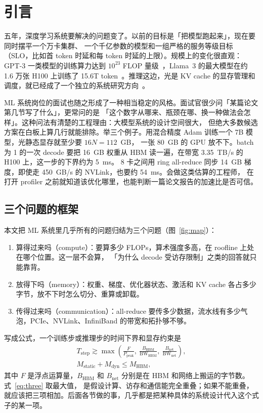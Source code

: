 \section{引言}
\label{sec:intro}

五年，深度学习系统要解决的问题变了。以前的目标是「把模型跑起来」，现在要同时摆平一个万卡集群、
一个千亿参数的模型和一组严格的服务等级目标（SLO，比如首 token 时延和每 token 时延的上限）。规模上的变化很直观：
GPT-3 一类模型的训练算力达到 $10^{23}$ FLOP 量级~\cite{brown2020gpt3}，Llama~3 的最大模型在约 1.6 万张 H100 上训练了
15.6T token~\cite{dubey2024llama3}。推理这边，光是 KV cache 的显存管理和调度，就已经成了一个独立的系统研究方向~\cite{kwon2023vllm,yu2022orca,agrawal2024sarathi,zhong2024distserve}。

ML 系统岗位的面试也随之形成了一种相当稳定的风格。面试官很少问「某篇论文第几节写了什么」，更常问的是
「这个数字从哪来、瓶颈在哪、换一种做法会怎样」。这种问法有清楚的工程理由：大模型系统的设计空间很大，
但绝大多数候选方案在白板上算几行就能排除。举三个例子。用混合精度 Adam 训练一个 7B 模型，光静态显存就至少要 $16N=112$~GB，
一张 80~GB 的 GPU 放不下。batch 为 1 的一次 decode 要把 16~GB 权重从 HBM 读一遍，在带宽 3.35~TB/s 的 H100 上，这一步的下界约为 5~ms。
8 卡之间用 ring all-reduce 同步 14~GB 梯度，即使走 450~GB/s 的 NVLink，也要约 54~ms。会做这类估算的工程师，
在打开 profiler 之前就知道该优化哪里，也能判断一篇论文报告的加速比是否可信。

\subsection{三个问题的框架}

本文把 ML 系统里几乎所有的问题归结为三个问题（图~\ref{fig:map}）：
\begin{enumerate}
\item 算得过来吗（compute）：要算多少 FLOPs，算术强度多高，在 roofline 上处在哪个位置。这一层不会算，
「为什么 decode 受访存限制」之类的回答就只能靠背。
\item 放得下吗（memory）：权重、梯度、优化器状态、激活和 KV cache 各占多少字节，放不下时怎么切分、重算或卸载。
\item 传得过来吗（communication）：all-reduce 要传多少数据，流水线有多少气泡，PCIe、NVLink、InfiniBand 的带宽和拓扑够不够。
\end{enumerate}
写成公式，一个训练步或推理步的时间下界和显存约束是
\begin{equation}
\begin{gathered}
T_{\text{step}} \gtrsim \max\!\left(\frac{F}{P_{\text{peak}}},\ \frac{B_{\text{HBM}}}{\mathrm{BW}_{\text{HBM}}},\
\frac{B_{\text{net}}}{\mathrm{BW}_{\text{net}}}\right),\\
M_{\text{static}} + M_{\text{dyn}} \le M_{\text{HBM}},
\end{gathered}
\label{eq:three}
\end{equation}
其中 $F$ 是浮点运算量，$B_{\text{HBM}}$ 和 $B_{\text{net}}$ 分别是在 HBM 和网络上搬运的字节数。式~\eqref{eq:three} 取最大值，
是假设计算、访存和通信能完全重叠；如果不能重叠，就应该把三项相加。后面各节做的事，几乎都是把某种具体的系统设计代入这个式子的某一项。

